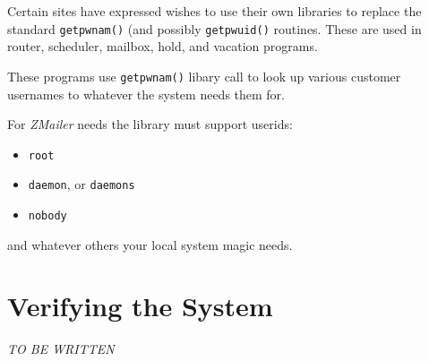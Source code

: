 \begin{description}
Certain sites have expressed wishes to use their own libraries
to replace the standard {\tt getpwnam()} (and possibly {\tt getpwuid()}
routines.
These are used in router, scheduler, mailbox, hold, and vacation
programs.

These programs use {\tt getpwnam()} libary call to look up
various customer usernames to whatever the system needs them
for.

For {\em ZMailer} needs the library must support userids:
\begin{itemize}
\item {\tt root}
\item {\tt daemon}, or {\tt daemons}
\item {\tt nobody}
\end{itemize}
and whatever others your local system magic needs.
\end{description}

\section{Verifying the System}

{\em\large TO BE WRITTEN}


